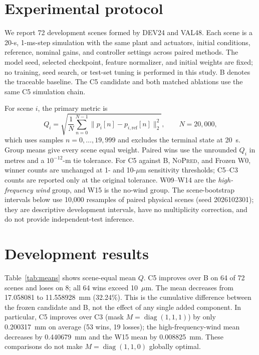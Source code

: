\documentclass[11pt]{article}
\newcommand{\NOpred}{\textsc{NoPred}}
\begin{document}
\section{Experimental protocol}
We report 72 development scenes formed by DEV24 and VAL48. Each scene is a 20-s, 1-ms-step simulation with the same plant and actuators, initial conditions, reference, nominal gains, and controller settings across paired methods. The model seed, selected checkpoint, feature normalizer, and initial weights are fixed; no training, seed search, or test-set tuning is performed in this study. B denotes the traceable baseline. The C5 candidate and both matched ablations use the same C5 simulation chain.

For scene $i$, the primary metric is
\begin{equation}
  Q_i=\sqrt{\frac{1}{N}\sum_{n=0}^{N-1}
      \|p_i[n]-p_{i,\mathrm{ref}}[n]\|_2^2},
  \qquad N=20{,}000,
  \label{eq:q}
\end{equation}
which uses samples $n=0,\ldots,19{,}999$ and excludes the terminal state at 20~s. Group means give every scene equal weight. Paired wins use the unrounded $Q_i$ in metres and a $10^{-12}$-m tie tolerance. For C5 against B, \NOpred{}, and Frozen W0, winner counts are unchanged at 1- and 10-$\mu$m sensitivity thresholds; C5--C3 counts are reported only at the original tolerance. W09--W14 are the \emph{high-frequency wind} group, and W15 is the no-wind group. The scene-bootstrap intervals below use 10,000 resamples of paired physical scenes (seed 2026102301); they are descriptive development intervals, have no multiplicity correction, and do not provide independent-test inference.

\section{Development results}
Table~\ref{tab:means} shows scene-equal mean $Q$. C5 improves over B on 64 of 72 scenes and loses on 8; all 64 wins exceed 10~$\mu$m. The mean decreases from 17.058081 to 11.558928~mm (32.24\%). This is the cumulative difference between the frozen candidate and B, not the effect of any single added component. In particular, C5 improves over C3 (mask $M=\operatorname{diag}(1,1,1)$) by only 0.200317~mm on average (53 wins, 19 losses); the high-frequency-wind mean decreases by 0.440679~mm and the W15 mean by 0.008825~mm. These comparisons do not make $M=\operatorname{diag}(1,1,0)$ globally optimal.
\end{document}
